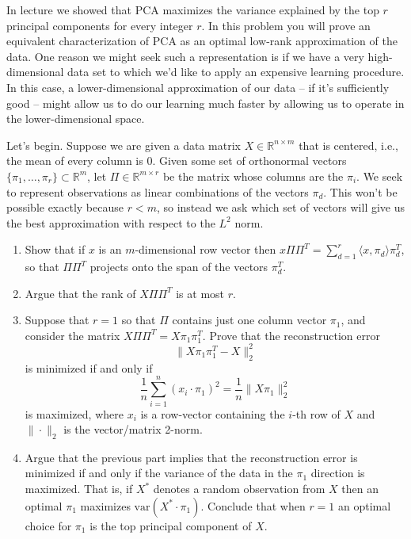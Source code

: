 \documentclass{harvardml}
\newcommand{\R}{\mathbb{R}}
\newcommand{\var}{\text{var}}
\theoremstyle{plain}
\begin{document}

\begin{problem}
In lecture we showed that PCA maximizes the variance explained by the top $r$ principal components for every integer $r$. In this problem you will prove an equivalent characterization of PCA as an optimal low-rank approximation of the data. One reason we might seek such a representation is if we have a very high-dimensional data set to which we'd like to apply an expensive learning procedure. In this case, a lower-dimensional approximation of our data \--- if it's sufficiently good \--- might allow us to do our learning much faster by allowing us to operate in the lower-dimensional space.

Let's begin. Suppose we are given a data matrix $X \in \R^{n \times m}$ that is centered, i.e., the mean of every column is 0. Given some set of orthonormal vectors $\{ \pi_1, \ldots, \pi_r\} \subset \R^m$, let $\Pi \in \R^{m \times r}$ be the matrix whose columns are the $\pi_i$. We seek to represent observations as linear combinations of the vectors $\pi_d$. This won't be possible exactly because $r < m$, so instead we ask which set of vectors will give us the best approximation with respect to the $L^2$ norm.

\begin{enumerate}[label=(\alph*)]
\item
Show that if $x$ is an $m$-dimensional row vector then $x \Pi \Pi^T = \sum_{d=1}^r \langle x, \pi_d \rangle \pi_d^T$, so that $\Pi \Pi^T$ projects onto the span of the vectors $\pi_d^T$.
\item
Argue that the rank of $X \Pi \Pi^T$ is at most $r$.

\item
Suppose that $r=1$ so that $\Pi$ contains just one column vector $\pi_1$, and consider the matrix $X \Pi\Pi^T = X \pi_1 \pi_1^T$. Prove that the reconstruction error
\[
\| X \pi_1\pi_1^T - X \|_2^2
\]
is minimized if and only if
\[
\frac{1}{n} \sum_{i=1}^n (x_i \cdot \pi_1)^2 = \frac{1}{n} \| X \pi_1 \|_2^2
\]
is maximized, where $x_i$ is a row-vector containing the $i$-th row of $X$ and $\| \cdot \|_2$ is the vector/matrix 2-norm.

\item
Argue that the previous part implies that the reconstruction error is minimized if and only if the variance of the data in the $\pi_1$ direction is maximized. That is, if $X^*$ denotes a random observation from $X$ then an optimal $\pi_1$ maximizes $\var(X^* \cdot \pi_1)$. Conclude that when $r=1$ an optimal choice for $\pi_1$ is the top principal component of $X$.


\end{enumerate}
\end{problem}
\end{document}
